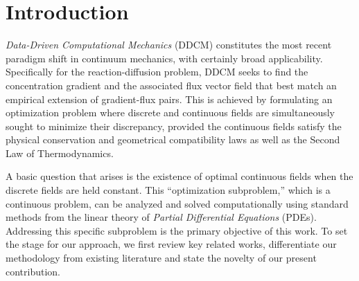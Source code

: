 
\section{Introduction}

\textit{Data-Driven Computational Mechanics} (DDCM) constitutes the most recent paradigm shift in continuum mechanics, with certainly broad applicability. Specifically for the reaction-diffusion problem, DDCM seeks to find the concentration gradient and the associated flux vector field that best match an empirical extension of gradient-flux pairs. This is achieved by formulating an optimization problem where discrete and continuous fields are simultaneously sought to minimize their discrepancy, provided the continuous fields satisfy the physical conservation and geometrical compatibility laws as well as the Second Law of Thermodynamics.

A basic question that arises is the existence of optimal continuous fields when the discrete fields are held constant. This ``optimization subproblem,'' which is a continuous problem, can be analyzed and solved computationally using standard methods from the linear theory of \textit{Partial Differential Equations} (PDEs). Addressing this specific subproblem is the primary objective of this work. To set the stage for our approach, we first review key related works, differentiate our methodology from existing literature and state the novelty of our present contribution.

